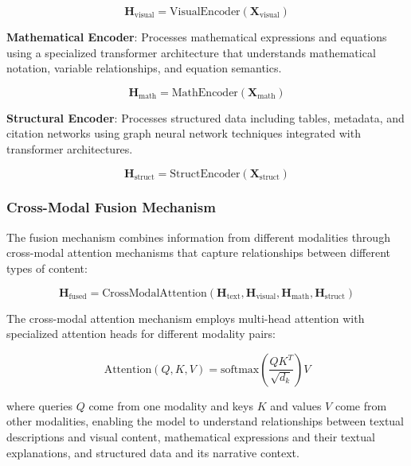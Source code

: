 \documentclass[10pt,twocolumn]{article}
\begin{document}
\begin{equation}
\mathbf{H}_{\text{visual}} = \text{VisualEncoder}(\mathbf{X}_{\text{visual}})
\end{equation}

\textbf{Mathematical Encoder}: Processes mathematical expressions and equations using a specialized transformer architecture that understands mathematical notation, variable relationships, and equation semantics.

\begin{equation}
\mathbf{H}_{\text{math}} = \text{MathEncoder}(\mathbf{X}_{\text{math}})
\end{equation}

\textbf{Structural Encoder}: Processes structured data including tables, metadata, and citation networks using graph neural network techniques integrated with transformer architectures.

\begin{equation}
\mathbf{H}_{\text{struct}} = \text{StructEncoder}(\mathbf{X}_{\text{struct}})
\end{equation}

\subsubsection{Cross-Modal Fusion Mechanism}

The fusion mechanism combines information from different modalities through cross-modal attention mechanisms that capture relationships between different types of content:

\begin{equation}
\mathbf{H}_{\text{fused}} = \text{CrossModalAttention}(\mathbf{H}_{\text{text}}, \mathbf{H}_{\text{visual}}, \mathbf{H}_{\text{math}}, \mathbf{H}_{\text{struct}})
\end{equation}

The cross-modal attention mechanism employs multi-head attention with specialized attention heads for different modality pairs:

\begin{equation}
\text{Attention}(Q, K, V) = \text{softmax}\left(\frac{QK^T}{\sqrt{d_k}}\right)V
\end{equation}

where queries $Q$ come from one modality and keys $K$ and values $V$ come from other modalities, enabling the model to understand relationships between textual descriptions and visual content, mathematical expressions and their textual explanations, and structured data and its narrative context.
\end{document}
